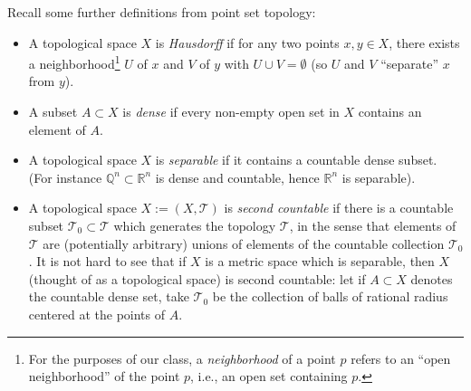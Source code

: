 \documentclass[11pt]{article}
\def\R{{\mathbb R}}
\def\Q{{\mathbb Q}}
\theoremstyle{remark}
\def\T{\mathcal{T}}
\begin{document}
Recall some further definitions from point set topology:
\begin{itemize}
    \item A topological space $X$ is {\em Hausdorff} if for any two points $x,y
        \in X$, there exists a neighborhood\footnote{For the purposes of our
            class, a {\em neighborhood} of a point $p$ refers to an ``open
        neighborhood'' of the point $p$, i.e., an open set containing $p$.} $U$
        of $x$ and $V$ of $y$ with $U \cup V = \emptyset$ (so $U$ and $V$
        ``separate'' $x$ from $y$).  

    \item  A subset $A \subset X$ is {\em dense} if every non-empty open set in
        $X$ contains an element of $A$.  

    \item A topological space $X$ is {\em separable} if it contains a countable
        dense subset. (For instance $\Q^n \subset \R^n$ is dense and countable,
        hence $\R^n$ is separable).  

    \item A topological space $X:=(X, \T)$ is {\em second countable} if there
        is a countable subset $\T_0 \subset \T$ which generates the topology
        $\T$, in the sense that elements of $\T$ are (potentially arbitrary)
        unions of elements of the countable collection $\T_0$.  It is not hard
        to see that if $X$ is a metric space which is separable, then $X$
        (thought of as a topological space) is second countable: let if $A
        \subset X$ denotes the countable dense set, take $\T_0$ be the
        collection of balls of rational radius centered at the points of $A$.
\end{itemize}
\end{document}
